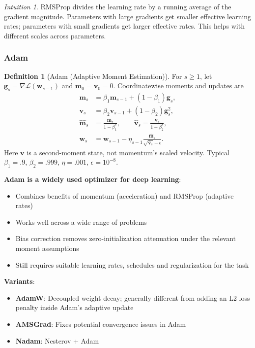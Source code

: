 \documentclass[11pt,twoside]{article}
\numberwithin{equation}{section}
\newcommand{\vect}[1]{\bm{#1}}
\newcommand{\Loss}{\mathcal{L}}
\theoremstyle{plain}
\theoremstyle{definition}
\newtheorem{definition}[theorem]{Definition}
\theoremstyle{remark}
\newtheorem{intuition}[theorem]{Intuition}
\newenvironment{keyidea}{
  \begin{tcolorbox}[colback=yellow!5!white,
                    colframe=yellow!50!black,
                    title=Key Idea,
                    breakable,
                    enhanced,
                    sharp corners,
                    boxrule=0.8pt,
                    left=6pt, right=6pt, top=6pt, bottom=6pt]
}{
  \end{tcolorbox}
}
\begin{document}
\begin{intuition}
RMSProp divides the learning rate by a running average of the gradient magnitude. Parameters with large gradients get smaller effective learning rates; parameters with small gradients get larger effective rates. This helps with different scales across parameters.
\end{intuition}

\subsubsection{Adam}

\begin{definition}[Adam (Adaptive Moment Estimation)]
For $s\ge1$, let $\vect g_s=\nabla\Loss(\vect w_{s-1})$ and
$\vect m_0=\vect v_0=0$. Coordinatewise moments and updates are
\begin{align}
\vect m_s&=\beta_1\vect m_{s-1}+(1-\beta_1)\vect g_s,\\
\vect v_s&=\beta_2\vect v_{s-1}+(1-\beta_2)\vect g_s^2,\\
\hat{\vect m}_s&=\frac{\vect m_s}{1-\beta_1^s},\qquad
\hat{\vect v}_s=\frac{\vect v_s}{1-\beta_2^s},\\
\vect w_s&=\vect w_{s-1}-\eta_{s-1}
 \frac{\hat{\vect m}_s}{\sqrt{\hat{\vect v}_s}+\epsilon}.
\end{align}
Here $\vect v$ is a second-moment state, not momentum's scaled velocity.
Typical $\beta_1=.9$, $\beta_2=.999$, $\eta=.001$, $\epsilon=10^{-8}$.
\end{definition}

\begin{keyidea}
\textbf{Adam is a widely used optimizer for deep learning}:
\begin{itemize}
\item Combines benefits of momentum (acceleration) and RMSProp (adaptive rates)
\item Works well across a wide range of problems
\item Bias correction removes zero-initialization attenuation under the relevant moment assumptions
\item Still requires suitable learning rates, schedules and regularization for the task
\end{itemize}

\textbf{Variants}:
\begin{itemize}
\item \textbf{AdamW}: Decoupled weight decay; generally different from adding an L2 loss penalty inside Adam's adaptive update
\item \textbf{AMSGrad}: Fixes potential convergence issues in Adam
\item \textbf{Nadam}: Nesterov + Adam
\end{itemize}
\end{keyidea}
\end{document}
